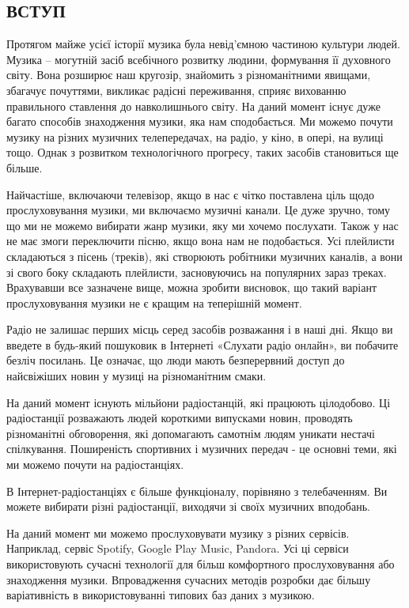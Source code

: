 \begin{center}\chapter*{ВСТУП}\end{center}

Протягом майже усієї історії музика була невід’ємною частиною культури людей. Музика – могутній засіб всебічного розвитку людини, формування її духовного світу. Вона розширює наш кругозір, знайомить з різноманітними явищами, збагачує почуттями, викликає радісні переживання, сприяє вихованню правильного ставлення до навколишнього світу. На даний момент існує дуже багато способів знаходження музики, яка нам сподобається. Ми можемо почути музику на різних музичних телепередачах, на радіо, у кіно, в опері, на вулиці тощо. Однак з розвитком технологічного прогресу, таких засобів становиться ще більше.

Найчастіше, включаючи телевізор, якщо в нас є чітко поставлена ціль щодо прослуховування музики, ми включаємо музичні канали. Це дуже зручно, тому що ми не можемо вибирати жанр музики, яку ми хочемо послухати. Також у нас не має змоги переключити пісню, якщо вона нам не подобається. Усі плейлисти складаються з пісень (треків), які створюють робітники музичних каналів, а вони зі свого боку складають плейлисти, засновуючись на популярних зараз треках. Врахувавши все зазначене вище, можна зробити висновок, що такий варіант прослуховування музики не є кращим на теперішній момент.

Радіо не залишає перших місць серед засобів розважання і в наші дні. Якщо ви введете в будь-який пошуковик в Інтернеті «Слухати радіо онлайн», ви побачите безліч посилань. Це означає, що люди мають безперервний доступ до найсвіжіших новин у музиці на різноманітним смаки.

На даний момент існують мільйони радіостанцій, які працюють цілодобово. Ці радіостанції розважають людей короткими випусками новин, проводять різноманітні обговорення, які допомагають самотнім людям уникати нестачі спілкування. Поширеність спортивних і музичних передач - це основні теми, які ми можемо почути на радіостанціях.

В Інтернет-радіостанціях є більше функціоналу, порівняно з телебаченням. Ви можете вибирати різні радіостанції, виходячи зі своїх музичних вподобань.

На даний момент ми можемо прослуховувати музику з різних сервісів. Наприклад, сервіс Spotify, Google Play Music, Pandora. Усі ці сервіси використовують сучасні технології для більш комфортного прослуховування або знаходження музики. Впровадження сучасних методів розробки дає більшу варіативність в використовуванні типових баз даних з музикою.


